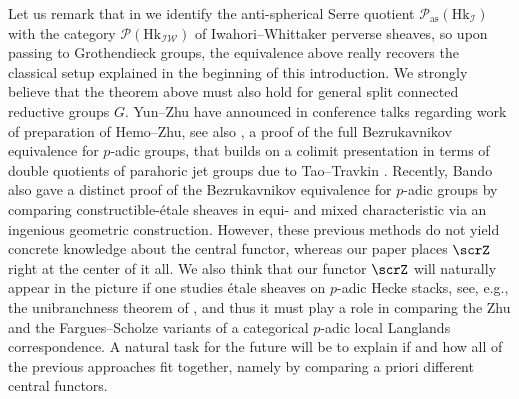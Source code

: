 \documentclass[10pt, reqno]{amsart}
\theoremstyle{plain}
\theoremstyle{definition}
\numberwithin{equation}{section}
\begin{document}
	Let us remark that in  we identify the anti-spherical Serre quotient $\mathscr{P}_{\mathrm{as}}(\mathrm{Hk}_{\mathcal{I}})$ with the category $\mathscr{P}(\mathrm{Hk}_{\mathcal{IW}})$ of Iwahori--Whittaker perverse sheaves, so upon passing to Grothendieck groups, the equivalence above really recovers the classical setup explained in the beginning of this introduction.
	We strongly believe that the theorem above must also hold for general split connected reductive groups $G$. Yun--Zhu have announced in conference talks regarding work of preparation of Hemo--Zhu, see also \cite{Zhu20}, a proof of the full Bezrukavnikov equivalence \cite{Bez16} for $p$-adic groups, that builds on a colimit presentation in terms of double quotients of parahoric jet groups due to Tao--Travkin \cite{TT20}. Recently, Bando \cite{Ban23} also gave a distinct proof of the Bezrukavnikov equivalence for $p$-adic groups by comparing constructible-étale sheaves in equi- and mixed characteristic via an ingenious geometric construction. However, these previous methods do not yield concrete knowledge about the central functor, whereas our paper places $\scrZ$ right at the center of it all. We also think that our functor $\scrZ$ will naturally appear in the picture if one studies étale sheaves on $p$-adic Hecke stacks, see, e.g., the unibranchness theorem of \cite{GL24}, and thus it must play a role in comparing the Zhu \cite{Zhu20} and the Fargues--Scholze \cite{FS21} variants of a categorical $p$-adic local Langlands correspondence. A natural task for the future will be to explain if and how all of the previous approaches fit together, namely by comparing a priori different central functors.
	
\end{document}
